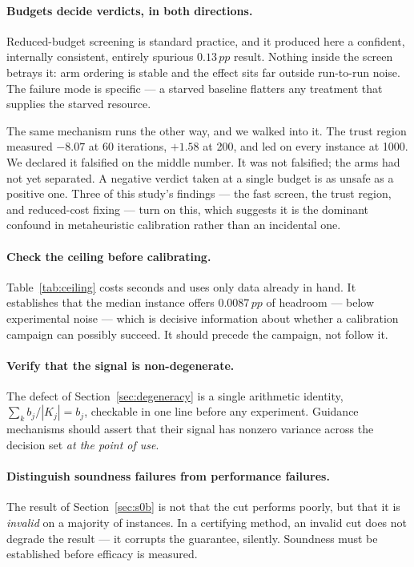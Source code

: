 \documentclass[11pt,a4paper]{article}
\newcommand{\Kj}{\ensuremath{K_j}}
\newcommand{\pp}{\,pp}
\begin{document}
\paragraph{Budgets decide verdicts, in both directions.}
Reduced-budget screening is standard practice, and it produced here a confident,
internally consistent, entirely spurious $0.13\pp$ result. Nothing inside the
screen betrays it: arm ordering is stable and the effect sits far outside
run-to-run noise. The failure mode is specific --- a starved baseline flatters any
treatment that supplies the starved resource.

The same mechanism runs the other way, and we walked into it. The trust region
measured $-8.07$ at 60 iterations, $+1.58$ at 200, and led on every instance at
1000. We declared it falsified on the middle number. It was not falsified; the
arms had not yet separated. A negative verdict taken at a single budget is as
unsafe as a positive one. Three of this study's findings --- the fast screen, the
trust region, and reduced-cost fixing --- turn on this, which suggests it is the
dominant confound in metaheuristic calibration rather than an incidental one.

\paragraph{Check the ceiling before calibrating.}
Table~\ref{tab:ceiling} costs seconds and uses only data already in hand. It
establishes that the median instance offers $0.0087\pp$ of headroom --- below
experimental noise --- which is decisive information about whether a calibration
campaign can possibly succeed. It should precede the campaign, not follow it.

\paragraph{Verify that the signal is non-degenerate.}
The defect of Section~\ref{sec:degeneracy} is a single arithmetic identity,
$\sum_k b_j/|\Kj|=b_j$, checkable in one line before any experiment. Guidance
mechanisms should assert that their signal has nonzero variance across the
decision set \emph{at the point of use}.

\paragraph{Distinguish soundness failures from performance failures.}
The result of Section~\ref{sec:s0b} is not that the cut performs poorly, but that
it is \emph{invalid} on a majority of instances. In a certifying method, an
invalid cut does not degrade the result --- it corrupts the guarantee, silently.
Soundness must be established before efficacy is measured.
\end{document}

